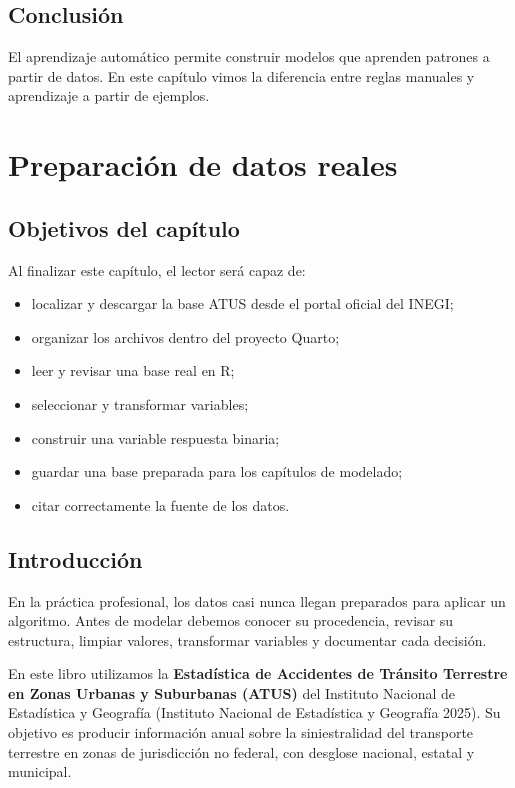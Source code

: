 \documentclass[
  spanish,
  10.5pt,
  letterpaper,
  openany,
  headings=big]{scrbook}
\providecommand{\tightlist}{%
  \setlength{\itemsep}{0pt}\setlength{\parskip}{0pt}}
\begin{document}
\section{Conclusión}\label{conclusiuxf3n}

El aprendizaje automático permite construir modelos que aprenden
patrones a partir de datos. En este capítulo vimos la diferencia entre
reglas manuales y aprendizaje a partir de ejemplos.


\chapter{Preparación de datos
reales}\label{preparaciuxf3n-de-datos-reales}

\section{Objetivos del capítulo}\label{objetivos-del-capuxedtulo-1}

Al finalizar este capítulo, el lector será capaz de:

\begin{itemize}
\tightlist
\item
  localizar y descargar la base ATUS desde el portal oficial del INEGI;
\item
  organizar los archivos dentro del proyecto Quarto;
\item
  leer y revisar una base real en R;
\item
  seleccionar y transformar variables;
\item
  construir una variable respuesta binaria;
\item
  guardar una base preparada para los capítulos de modelado;
\item
  citar correctamente la fuente de los datos.
\end{itemize}

\section{Introducción}\label{introducciuxf3n-1}

En la práctica profesional, los datos casi nunca llegan preparados para
aplicar un algoritmo. Antes de modelar debemos conocer su procedencia,
revisar su estructura, limpiar valores, transformar variables y
documentar cada decisión.

En este libro utilizamos la \textbf{Estadística de Accidentes de
Tránsito Terrestre en Zonas Urbanas y Suburbanas (ATUS)} del Instituto
Nacional de Estadística y Geografía (Instituto Nacional de Estadística y
Geografía 2025). Su objetivo es producir información anual sobre la
siniestralidad del transporte terrestre en zonas de jurisdicción no
federal, con desglose nacional, estatal y municipal.
\end{document}
